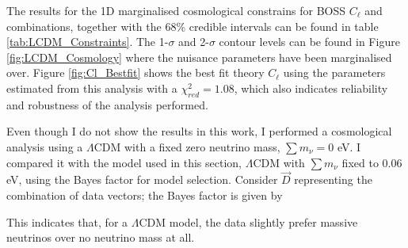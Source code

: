 \qquad The results for the 1D marginalised cosmological constrains for BOSS $C_{\ell}$ and combinations, together with the 68\% credible intervals can be found in table \ref{tab:LCDM_Constraints}. The 1-$\sigma$ and 2-$\sigma$ contour levels can be found in Figure \ref{fig:LCDM_Cosmology} where the nuisance parameters have been marginalised over. Figure \ref{fig:Cl_Bestfit} shows the best fit theory $C_{\ell}$ using the parameters estimated from this analysis with a $\chi^2_{red} = 1.08$, which also indicates reliability and robustness of the analysis performed. 

\qquad Even though I do not show the results in this work, I performed a cosmological analysis using a $\Lambda$CDM with a fixed zero neutrino mass, $\sum m_{\nu} = 0$ eV. I compared it with the model used in this section, $\Lambda$CDM with $\sum m_{\nu}$ fixed to $0.06$ eV, using the Bayes factor for model selection. Consider $\vec{D}$ representing the combination of data vectors; the Bayes factor is given by

\noindent This indicates that, for a $\Lambda$CDM model, the data slightly prefer massive neutrinos over no neutrino mass at all.


